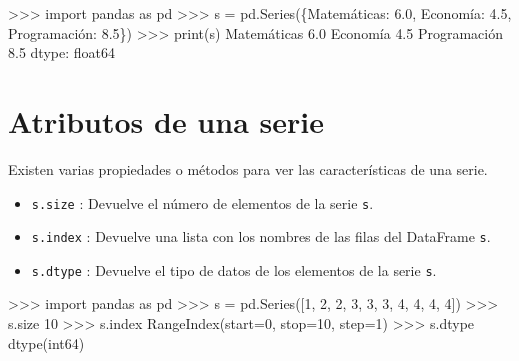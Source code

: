 \documentclass[
  spanish,
  a4paper,
]{scrreport}
\newenvironment{Shaded}{\begin{snugshade}}{\end{snugshade}}
\newcommand{\BuiltInTok}[1]{\textcolor[rgb]{0.00,0.23,0.31}{#1}}
\newcommand{\DecValTok}[1]{\textcolor[rgb]{0.68,0.00,0.00}{#1}}
\newcommand{\FloatTok}[1]{\textcolor[rgb]{0.68,0.00,0.00}{#1}}
\newcommand{\ImportTok}[1]{\textcolor[rgb]{0.00,0.46,0.62}{#1}}
\newcommand{\NormalTok}[1]{\textcolor[rgb]{0.00,0.23,0.31}{#1}}
\newcommand{\OperatorTok}[1]{\textcolor[rgb]{0.37,0.37,0.37}{#1}}
\newcommand{\StringTok}[1]{\textcolor[rgb]{0.13,0.47,0.30}{#1}}
\begin{document}
\begin{Shaded}
\begin{Highlighting}[]
\OperatorTok{\textgreater{}\textgreater{}\textgreater{}} \ImportTok{import}\NormalTok{ pandas }\ImportTok{as}\NormalTok{ pd}
\OperatorTok{\textgreater{}\textgreater{}\textgreater{}}\NormalTok{ s }\OperatorTok{=}\NormalTok{ pd.Series(\{}\StringTok{\textquotesingle{}Matemáticas\textquotesingle{}}\NormalTok{: }\FloatTok{6.0}\NormalTok{,  }\StringTok{\textquotesingle{}Economía\textquotesingle{}}\NormalTok{: }\FloatTok{4.5}\NormalTok{, }\StringTok{\textquotesingle{}Programación\textquotesingle{}}\NormalTok{: }\FloatTok{8.5}\NormalTok{\})}
\OperatorTok{\textgreater{}\textgreater{}\textgreater{}} \BuiltInTok{print}\NormalTok{(s)}
\NormalTok{Matemáticas     }\FloatTok{6.0}
\NormalTok{Economía        }\FloatTok{4.5}
\NormalTok{Programación    }\FloatTok{8.5}
\NormalTok{dtype: float64}
\end{Highlighting}
\end{Shaded}

\section{Atributos de una serie}\label{atributos-de-una-serie}

Existen varias propiedades o métodos para ver las características de una
serie.

\begin{itemize}
\item
  \texttt{s.size} : Devuelve el número de elementos de la serie
  \texttt{s}.
\item
  \texttt{s.index} : Devuelve una lista con los nombres de las filas del
  DataFrame \texttt{s}.
\item
  \texttt{s.dtype} : Devuelve el tipo de datos de los elementos de la
  serie \texttt{s}.
\end{itemize}

\begin{Shaded}
\begin{Highlighting}[]
\OperatorTok{\textgreater{}\textgreater{}\textgreater{}} \ImportTok{import}\NormalTok{ pandas }\ImportTok{as}\NormalTok{ pd}
\OperatorTok{\textgreater{}\textgreater{}\textgreater{}}\NormalTok{ s }\OperatorTok{=}\NormalTok{ pd.Series([}\DecValTok{1}\NormalTok{, }\DecValTok{2}\NormalTok{, }\DecValTok{2}\NormalTok{, }\DecValTok{3}\NormalTok{, }\DecValTok{3}\NormalTok{, }\DecValTok{3}\NormalTok{, }\DecValTok{4}\NormalTok{, }\DecValTok{4}\NormalTok{, }\DecValTok{4}\NormalTok{, }\DecValTok{4}\NormalTok{])}
\OperatorTok{\textgreater{}\textgreater{}\textgreater{}}\NormalTok{ s.size}
\DecValTok{10}
\OperatorTok{\textgreater{}\textgreater{}\textgreater{}}\NormalTok{ s.index}
\NormalTok{RangeIndex(start}\OperatorTok{=}\DecValTok{0}\NormalTok{, stop}\OperatorTok{=}\DecValTok{10}\NormalTok{, step}\OperatorTok{=}\DecValTok{1}\NormalTok{)}
\OperatorTok{\textgreater{}\textgreater{}\textgreater{}}\NormalTok{ s.dtype}
\NormalTok{dtype(}\StringTok{\textquotesingle{}int64\textquotesingle{}}\NormalTok{)}
\end{Highlighting}
\end{Shaded}
\end{document}
